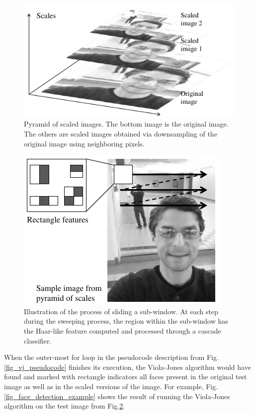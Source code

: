 \documentclass[conference]{IEEEtran}
\begin{document}
\begin{figure}[!htb]
\centering
	\includegraphics[scale=1.0]{fig_pyramid}
\caption{Pyramid of scaled images. The bottom image is the original image. The others are scaled images obtained via downsampling of the original image using neighboring pixels.}
\label{fig_pyramid}
\end{figure}

\begin{figure}[!htb]
\centering
	\includegraphics[scale=1.0]{fig_sliding}
\caption{Illustration of the process of sliding a sub-window. At each step during the sweeping process, the region within the sub-window has the Haar-like feature computed and processed through a cascade classifier.}
\label{fig_sliding}
\end{figure}


When the outer-most for loop in the pseudocode description from Fig.\ref{fig_vj_pseudocode} finishes its execution, the Viola-Jones algorithm would have found and marked with rectangle indicators all faces present in the original test image as well as in the scaled versions of the image. For example, Fig.\ref{fig_face_detection_example} shows the result of running the Viola-Jones algorithm on the test image from Fig.\ref{fig_sliding}.
\end{document}
